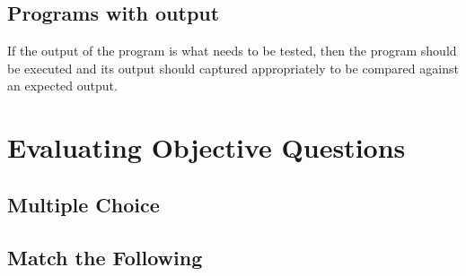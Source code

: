 \documentclass{article}
\begin{document}
\subsection{Programs with output}
If the output of the program is what needs to be tested, then the program should be executed and its output should captured appropriately to be compared against an expected output.

\section{Evaluating Objective Questions}

\subsection{Multiple Choice}

\subsection{Match the Following}
\end{document}
